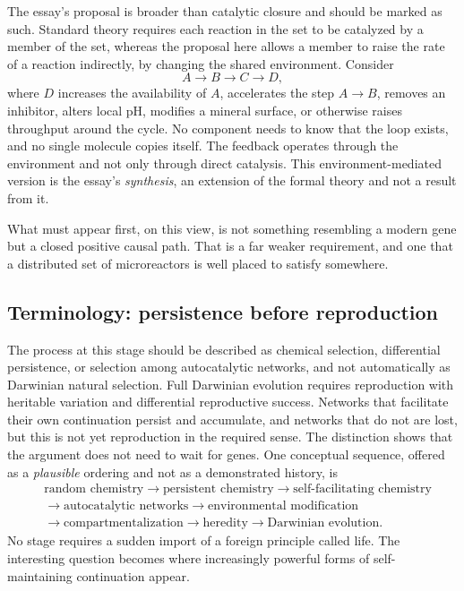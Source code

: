 \documentclass[11pt]{article}
\begin{document}
The essay's proposal is broader than catalytic closure and should be marked as such. Standard theory requires each reaction in the set to be catalyzed by a member of the set, whereas the proposal here allows a member to raise the rate of a reaction indirectly, by changing the shared environment. Consider
\begin{equation*}
A \rightarrow B \rightarrow C \rightarrow D,
\end{equation*}
where $D$ increases the availability of $A$, accelerates the step $A \rightarrow B$, removes an inhibitor, alters local pH, modifies a mineral surface, or otherwise raises throughput around the cycle. No component needs to know that the loop exists, and no single molecule copies itself. The feedback operates through the environment and not only through direct catalysis. This environment-mediated version is the essay's \emph{synthesis}, an extension of the formal theory and not a result from it.

What must appear first, on this view, is not something resembling a modern gene but a closed positive causal path. That is a far weaker requirement, and one that a distributed set of microreactors is well placed to satisfy somewhere.

\subsection{Terminology: persistence before reproduction}

The process at this stage should be described as chemical selection, differential persistence, or selection among autocatalytic networks, and not automatically as Darwinian natural selection. Full Darwinian evolution requires reproduction with heritable variation and differential reproductive success. Networks that facilitate their own continuation persist and accumulate, and networks that do not are lost, but this is not yet reproduction in the required sense. The distinction shows that the argument does not need to wait for genes. One conceptual sequence, offered as a \emph{plausible} ordering and not as a demonstrated history, is
\begin{align*}
&\text{random chemistry} \rightarrow \text{persistent chemistry} \rightarrow \text{self-facilitating chemistry}\\
&\rightarrow \text{autocatalytic networks} \rightarrow \text{environmental modification}\\
&\rightarrow \text{compartmentalization} \rightarrow \text{heredity} \rightarrow \text{Darwinian evolution}.
\end{align*}
No stage requires a sudden import of a foreign principle called life. The interesting question becomes where increasingly powerful forms of self-maintaining continuation appear.
\end{document}
